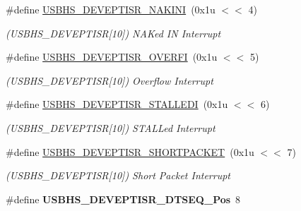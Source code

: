 \begin{DoxyCompactItemize}
\#define \mbox{\hyperlink{group__SAMV71__USBHS_ga529fa6ed28b70b37d2fe4ab6e84f172a}{U\+S\+B\+H\+S\+\_\+\+D\+E\+V\+E\+P\+T\+I\+S\+R\+\_\+\+N\+A\+K\+I\+NI}}~(0x1u $<$$<$ 4)
\begin{DoxyCompactList}\small\item\em (U\+S\+B\+H\+S\+\_\+\+D\+E\+V\+E\+P\+T\+I\+SR\mbox{[}10\mbox{]}) N\+A\+Ked IN Interrupt \end{DoxyCompactList}\item 
\mbox{\label{group__SAMV71__USBHS_gacb8f42f7eb36900d7a54ab563c416d79}} 
\#define \mbox{\hyperlink{group__SAMV71__USBHS_gacb8f42f7eb36900d7a54ab563c416d79}{U\+S\+B\+H\+S\+\_\+\+D\+E\+V\+E\+P\+T\+I\+S\+R\+\_\+\+O\+V\+E\+R\+FI}}~(0x1u $<$$<$ 5)
\begin{DoxyCompactList}\small\item\em (U\+S\+B\+H\+S\+\_\+\+D\+E\+V\+E\+P\+T\+I\+SR\mbox{[}10\mbox{]}) Overflow Interrupt \end{DoxyCompactList}\item 
\mbox{\label{group__SAMV71__USBHS_ga8c7202988532c09acf4906a50eb93b1e}} 
\#define \mbox{\hyperlink{group__SAMV71__USBHS_ga8c7202988532c09acf4906a50eb93b1e}{U\+S\+B\+H\+S\+\_\+\+D\+E\+V\+E\+P\+T\+I\+S\+R\+\_\+\+S\+T\+A\+L\+L\+E\+DI}}~(0x1u $<$$<$ 6)
\begin{DoxyCompactList}\small\item\em (U\+S\+B\+H\+S\+\_\+\+D\+E\+V\+E\+P\+T\+I\+SR\mbox{[}10\mbox{]}) S\+T\+A\+L\+Led Interrupt \end{DoxyCompactList}\item 
\mbox{\label{group__SAMV71__USBHS_ga772ac931e2e8399d48549904ea66137c}} 
\#define \mbox{\hyperlink{group__SAMV71__USBHS_ga772ac931e2e8399d48549904ea66137c}{U\+S\+B\+H\+S\+\_\+\+D\+E\+V\+E\+P\+T\+I\+S\+R\+\_\+\+S\+H\+O\+R\+T\+P\+A\+C\+K\+ET}}~(0x1u $<$$<$ 7)
\begin{DoxyCompactList}\small\item\em (U\+S\+B\+H\+S\+\_\+\+D\+E\+V\+E\+P\+T\+I\+SR\mbox{[}10\mbox{]}) Short Packet Interrupt \end{DoxyCompactList}\item 
\mbox{\label{group__SAMV71__USBHS_gac0b20e7f751dce14b2a533e177695489}} 
\#define {\bfseries U\+S\+B\+H\+S\+\_\+\+D\+E\+V\+E\+P\+T\+I\+S\+R\+\_\+\+D\+T\+S\+E\+Q\+\_\+\+Pos}~8

\end{DoxyCompactItemize}
